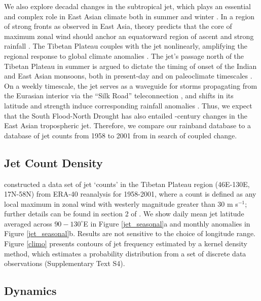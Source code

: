 	We also explore decadal changes in the subtropical jet, which plays an essential and complex role in East Asian climate both in summer and winter \citep{Molnar2010,Yang2002}. In a region of strong fronts as observed in East Asia, theory predicts that the core of maximum zonal wind should anchor an equatorward region of ascent and strong rainfall \citep{Holton2004}. The Tibetan Plateau couples with the jet nonlinearly, amplifying the regional response to global climate anomalies \citep{Nigam1989,Broccoli1992,Park1997}. The jet's passage north of the Tibetan Plateau in summer is argued to dictate the timing of onset of the Indian and East Asian monsoons, both in present-day \citep{Yin1949,Yeh1959,Hahn1975} and on paleoclimate timescales \citep{Nagashima2011,Nagashima2013,Chiang2015}. On a weekly timescale, the jet serves as a waveguide for storms propagating from the Eurasian interior via the ``Silk Road'' teleconnection \citep{Hoskins1993,Ambrizzi1997,Kosaka2012}, and shifts in its latitude and strength induce corresponding rainfall anomalies \citep{Liang1998,Kwon2007,Du2009,Li2014}. Thus, we expect that the South Flood-North Drought has also entailed -century changes in the East Asian tropospheric jet. Therefore, we compare our rainband database to a database of jet counts from 1958 to 2001 from \citet{Schiemann2009} in search of coupled change.
	
\subsection{Jet Count Density} 

	\citet{Schiemann2009} constructed a data set of jet `counts' in the Tibetan Plateau region (46\textdegree E-130\textdegree E, 17\textdegree N-58\textdegree N) from ERA-40 reanalysis for 1958-2001, where a count is defined as any local maximum in zonal wind with westerly magnitude greater than $30$ m s$^{-1}$; further details can be found in section 2 of \citet{Schiemann2009}. We show daily mean jet latitude averaged across $90-130^\circ$E in Figure \ref{jet_seasonal}a and monthly anomalies in Figure \ref{jet_seasonal}b. Results are not sensitive to the choice of longitude range. Figure \ref{climo} presents contours of jet frequency estimated by a kernel density method, which estimates a probability distribution from a set of discrete data observations (Supplementary Text S4).

\subsection{Dynamics}

